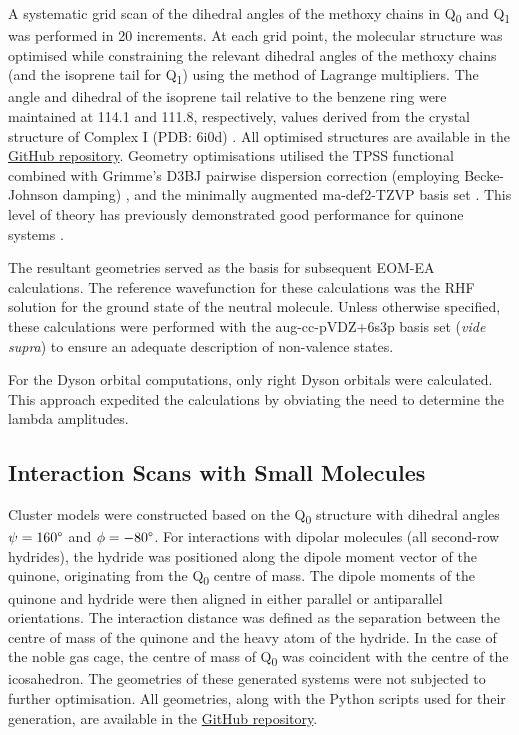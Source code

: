 A systematic grid scan of the dihedral angles of the methoxy chains in Q\textsubscript{0} and Q\textsubscript{1} was performed in 20\degree{} increments. At each grid point, the molecular structure was optimised while constraining the relevant dihedral angles of the methoxy chains (and the isoprene tail for Q\textsubscript{1}) using the method of Lagrange multipliers. The angle and dihedral of the isoprene tail relative to the benzene ring were maintained at 114.1\degree{} and 111.8\degree{}, respectively, values derived from the crystal structure of Complex I (PDB: 6i0d) \cite{gutierrez2020key}. All optimised structures are available in the \href{https://github.com/EliteSushi/TCCM_Thesis}{GitHub repository}. Geometry optimisations utilised the TPSS functional \cite{tao2003climbing} combined with Grimme's D3BJ pairwise dispersion correction (employing Becke-Johnson damping) \cite{grimme2011effect}, and the minimally augmented ma-def2-TZVP basis set \cite{zheng2011minimally,weigend2005balanced}. This level of theory has previously demonstrated good performance for quinone systems \cite{schulz2018systematic}.

The resultant geometries served as the basis for subsequent EOM-EA calculations. The reference wavefunction for these calculations was the RHF solution for the ground state of the neutral molecule. Unless otherwise specified, these calculations were performed with the aug-cc-pVDZ+6s3p basis set (\textit{vide supra}) to ensure an adequate description of non-valence states.

For the Dyson orbital computations, only right Dyson orbitals were calculated. This approach expedited the calculations by obviating the need to determine the lambda amplitudes.


\subsection{Interaction Scans with Small Molecules}

Cluster models were constructed based on the Q\textsubscript{0} structure with dihedral angles $\mathrm{\psi=160\degree{}}$ and $\mathrm{\phi=-80\degree{}}$. For interactions with dipolar molecules (all second-row hydrides), the hydride was positioned along the dipole moment vector of the quinone, originating from the Q\textsubscript{0} centre of mass. The dipole moments of the quinone and hydride were then aligned in either parallel or antiparallel orientations. The interaction distance was defined as the separation between the centre of mass of the quinone and the heavy atom of the hydride. In the case of the noble gas cage, the centre of mass of Q\textsubscript{0} was coincident with the centre of the icosahedron. The geometries of these generated systems were not subjected to further optimisation. All geometries, along with the Python scripts used for their generation, are available in the \href{https://github.com/EliteSushi/TCCM_Thesis}{GitHub repository}.\\

\cleardoublepage

